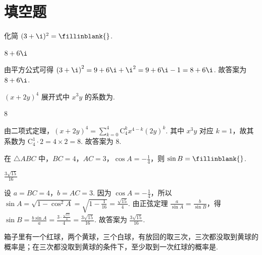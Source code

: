 \documentclass[UTF8,a4paper,oneside,11pt]{ctexbook}
\begin{document}
\section{填空题}

\begin{problem}
化简 \((3+\i)^2=\fillinblank{}\).
\end{problem}

\begin{answer}
\(8+6\i\)
\end{answer}

\begin{solution}
由平方公式可得 \(\left( 3+\i \right)^2=9+6\i+\i^2=9+6\i-1=8+6\i\). 故答案为 \(8+6\i\).
\end{solution}

\begin{problem}
\((x+2y)^4\) 展开式中 \(x^3y\) 的系数为\fillinblank{}.
\end{problem}

\begin{answer}
\(8\)
\end{answer}

\begin{solution}
由二项式定理，\(\left( x+2y \right)^4=\sum_{k=0}^4 \mathrm C_4^k x^{4-k}\left( 2y \right)^k\). 其中 \(x^3y\) 对应 \(k=1\)，故其系数为 \(\mathrm C_4^1\cdot 2=4\times 2=8\). 故答案为 \(8\).
\end{solution}

\begin{problem}
在 \(\triangle ABC\) 中，\(BC=4\)，\(AC=3\)，\(\cos A=-\frac{1}{4}\)，则 \(\sin B=\fillinblank{}\).
\end{problem}

\begin{answer}
\(\frac{3\sqrt{15}}{16}\)
\end{answer}

\begin{solution}
设 \(a=BC=4\)，\(b=AC=3\). 因为 \(\cos A=-\frac{1}{4}\)，所以 \(\sin A=\sqrt{1-\cos^2 A}=\sqrt{1-\frac{1}{16}}=\frac{\sqrt{15}}{4}\).
由正弦定理 \(\frac{a}{\sin A}=\frac{b}{\sin B}\)，得 \(\sin B=\frac{b\sin A}{a}=\frac{3\cdot \frac{\sqrt{15}}{4}}{4}=\frac{3\sqrt{15}}{16}\).
故答案为 \(\frac{3\sqrt{15}}{16}\).
\end{solution}

\begin{problem}
箱子里有一个红球，两个黄球，三个白球，有放回的取三次，三次都没取到黄球的概率是\fillinblank{}；在三次都没取到黄球的条件下，至少取到一次红球的概率是\fillinblank{}.
\end{problem}
\end{document}
